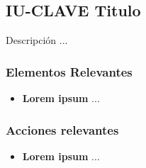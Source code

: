 
\subsection{IU-CLAVE Titulo}

 Descripción ...


\subsubsection{Elementos Relevantes}

    \begin{itemize}
    \item {\bf Lorem ipsum}
        ...
    \end{itemize}

\subsubsection{Acciones relevantes}

    \begin{itemize}
    \item {\bf Lorem ipsum}
        ...
    \end{itemize}

\clearpage
